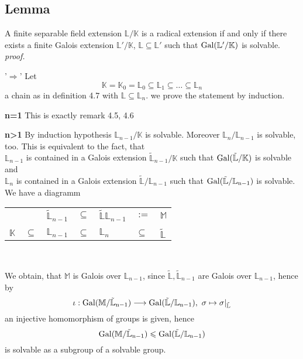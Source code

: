 \documentclass[12pt]{book}
\newcommand\tabrotate[1]{\rotatebox{90}{#1\hspace{\tabcolsep}}}
\begin{document}
\begin{spacing}{1.3}
\subsection{Lemma}%
A finite separable field extension $\mathbb{L}/\mathbb{K}$ is a radical extension if and only if there exists a finite Galois extension $\mathbb{L}'/\mathbb{K}$, $\mathbb{L} \subseteq \mathbb{L}'$ such that $\rm{Gal}(\mathbb{L}'/\mathbb{K})$ is solvable.\\
\textit{proof.}
\begin{compactitem}
\item['$\Rightarrow$'] Let $$\mathbb{K}=\mathbb{K}_0=\mathbb{L}_0 \subseteq \mathbb{L}_1 \subseteq \dots \subseteq \mathbb{L}_n$$ a chain as in definition 4.7 with $\mathbb{L} \subseteq \mathbb{L}_n$. we prove the statement by induction.
\begin{compactitem}
\item[\bf{n=1}] This is exactly remark 4.5, 4.6
\item[\bf{n>1}] By induction hypothesis $\mathbb{L}_{n-1}/\mathbb{K}$ is solvable. Moreover $\mathbb{L}_n/\mathbb{L}_{n-1}$ is solvable, too. This is equivalent to the fact, that\\
$\mathbb{L}_{n-1}$ is contained in a Galois extension $\tilde{\mathbb{L}}_{n-1}/\mathbb{K}$ such that $\rm{Gal}(\tilde{\mathbb{L}}/\mathbb{K})$ is solvable and\\
$\mathbb{L}_n$ is contained in a Galois extension $\tilde{\mathbb{L}}/\mathbb{L}_{n-1}$ such that $\rm{Gal}(\tilde{\mathbb{L}}/\mathbb{L}_{n-1})$ is solvable.\\
We have a diagramm
\begin{center}
\begin{tabular}{*{7}{l}}
&& $\tilde{\mathbb{L}}_{n-1}$ & $\subseteq$ &$ \tilde{\mathbb{L}}\mathbb{L}_{n-1}$ &$ := $& $\mathbb{M} $\\
&& \tabrotate{$\subseteq$} &&&& \tabrotate{$\subseteq$}\\
$\mathbb{K}$ & $\subseteq$ &$ \mathbb{L}_{n-1} $&$ \subseteq$ &$ \mathbb{L}_n $&$ \subseteq $& $\tilde{\mathbb{L}} $\\
\end{tabular}\\
\end{center}
We obtain, that $\mathbb{M}$ is Galois over $\mathbb{L}_{n-1}$, since $\tilde{\mathbb{L}}, \tilde{\mathbb{L}}_{n-1}$ are Galois over $\mathbb{L}_{n-1}$, hence by
$$\iota: \rm{Gal}(\mathbb{M}/\tilde{\mathbb{L}}_{n-1}) \longrightarrow \rm{Gal}(\tilde{\mathbb{L}}/\mathbb{L}_{n-1}), \textrm{ } \sigma \mapsto \sigma |_{\tilde{\mathbb{L}}}$$ an injective homomorphism of groups is given, hence $$\rm{Gal}(\mathbb{M}/\tilde{\mathbb{L}}_{n-1}) \leqslant \rm{Gal}(\tilde{\mathbb{L}}/\mathbb{L}_{n-1})$$ is solvable as a subgroup of a solvable group.\\

\end{compactitem}
\end{compactitem}
\end{spacing}
\end{document}
